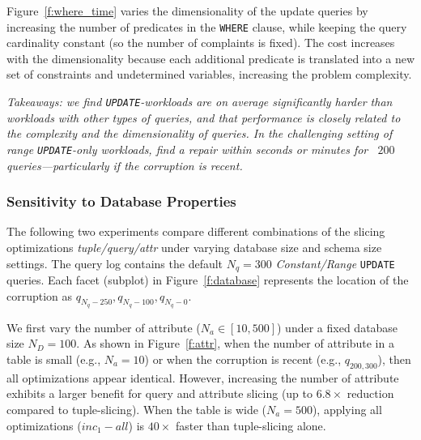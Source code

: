 \smallskip
{}
Figure~\ref{f:where_time} varies the dimensionality of the update queries by increasing the number of predicates in the \texttt{WHERE} clause, while keeping the query cardinality constant (so the number of complaints is fixed).
The cost increases with the dimensionality because each additional predicate is translated into a new set of constraints and undetermined variables, increasing the problem complexity.

\smallskip
\textit{
  Takeaways: we find \texttt{UPDATE}-workloads are on average significantly harder than workloads with other types of queries, and that
  performance is closely related to the complexity and the dimensionality of queries. 
  In the challenging setting of range \texttt{UPDATE}-only workloads, \sys find a repair within seconds or minutes for ~$200$ queries---particularly if the corruption is recent. 
}




\subsubsection{Sensitivity to Database Properties}
\label{sec:experiments:dbproperties}

The following two experiments compare different combinations of the slicing optimizations \emph{tuple/query/attr} under varying database size and schema size settings.  
The query log contains the default $N_q = 300$ {\it Constant/Range} \texttt{UPDATE} queries.
Each facet (subplot) in Figure~\ref{f:database} represents the location of the corruption as $q_{N_q-250}, q_{N_q-100}, q_{N_q-0}$.

 
We first vary the number of attribute ($N_a \in [10, 500]$) under a fixed database size $N_D = 100$.
As shown in Figure~\ref{f:attr}, when the number of attribute in a table is small (e.g., $N_a=10$) or when the corruption is recent (e.g., $q_{200, 300}$), then all optimizations appear identical. 
However, increasing the number of attribute exhibits a larger benefit for query and attribute slicing (up to $6.8\times$ reduction compared to tuple-slicing).
When the table is wide ($N_a = 500$), applying all optimizations ($inc_1-all$) is $40\times$ faster than tuple-slicing alone.  


